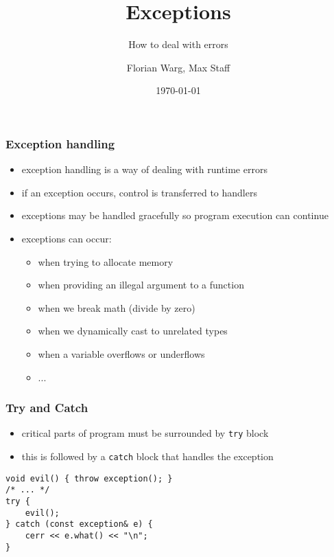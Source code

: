 
\usepackage{colortbl}



\title{Exceptions}
\subtitle{How to deal with errors}
\date{\today}
\author{Florian Warg, Max Staff}

\maketitle

\begin{frame}[fragile]
    \frametitle{Exception handling}
    \begin{itemize}
    \item exception handling is a way of dealing with runtime errors
    \item if an exception occurs, control is transferred to handlers
    \item exceptions may be handled gracefully so program execution can continue
    \item exceptions can occur:
    \begin{itemize}
        \item when trying to allocate memory
        \item when providing an illegal argument to a function
        \item when we break math (divide by zero)
        \item when we dynamically cast to unrelated types
        \item when a variable overflows or underflows
        \item ...
    \end{itemize}
    \end{itemize}
\end{frame}

\begin{frame}[fragile]
    \frametitle{Try and Catch}
    \begin{itemize}
        \item critical parts of program must be surrounded by \lstinline{try} block
        \item this is followed by a \lstinline{catch} block that handles the exception
    \end{itemize}
    \begin{lstlisting}[numbers=none]
void evil() { throw exception(); }
/* ... */
try {
    evil();
} catch (const exception& e) {
    cerr << e.what() << "\n";
}
    \end{lstlisting}
\end{frame}

